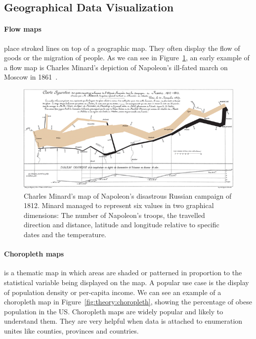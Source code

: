 \subsection{Geographical Data Visualization}
\paragraph{Flow maps} place stroked lines on top of a geographic map.
They often display the flow of goods or the migration of people.
As we can see in Figure~\ref{fig:theory:flow-map}, an early example of a flow map is Charles Minard’s depiction of Napoleon’s ill-fated march on Moscow in 1861~\cite{Corbett2001}.
\begin{figure}[h]
  \centering
  \includegraphics[width=\textwidth]{images/theory/minard}
  \caption{%
    Charles Minard's map of Napoleon's disastrous Russian campaign of 1812.
    Minard managed to represent six values in two graphical dimensions:
    The number of Napoleon's troops, the travelled direction and distance, latitude and longitude relative to specific dates and the temperature.
  }\label{fig:theory:flow-map}
\end{figure}

\paragraph{Choropleth maps} is a thematic map in which areas are shaded or patterned in proportion to the statistical variable being displayed on the map.
A popular use case is the display of population density or per-capita income.
We can see an example of a choropleth map in Figure~\ref{fig:theory:choropleth}, showing the percentage of obese population in the US\@.
Choropleth maps are widely popular and likely to understand them.
They are very helpful when data is attached to enumeration unites like counties, provinces and countries.

